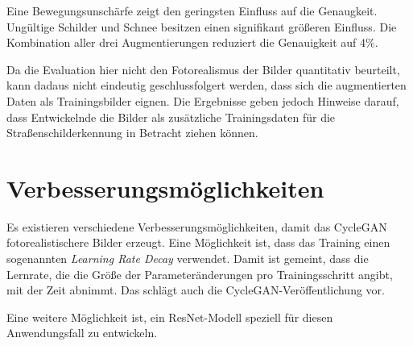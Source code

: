 Eine Bewegungsunschärfe zeigt den geringsten Einfluss auf die Genaugkeit. Ungültige Schilder und Schnee besitzen einen signifikant größeren Einfluss. Die Kombination aller drei Augmentierungen reduziert die Genauigkeit auf 4\%.

Da die Evaluation hier nicht den Fotorealismus der Bilder quantitativ beurteilt, kann dadaus nicht eindeutig geschlussfolgert werden, dass sich die augmentierten Daten als Trainingsbilder eignen. Die Ergebnisse geben jedoch Hinweise darauf, dass Entwickelnde die Bilder als zusätzliche Trainingsdaten für die Straßenschilderkennung in Betracht ziehen können.

\section{Verbesserungsmöglichkeiten}

Es existieren verschiedene Verbesserungsmöglichkeiten, damit das \ac{CycleGAN} fotorealistischere Bilder erzeugt. Eine Möglichkeit ist, dass das Training einen sogenannten \emph{Learning Rate Decay} verwendet. Damit ist gemeint, dass die Lernrate, die die Größe der Parameteränderungen pro Trainingsschritt angibt, mit der Zeit abnimmt. Das schlägt auch die \ac{CycleGAN}-Veröffentlichung vor.

Eine weitere Möglichkeit ist, ein ResNet-Modell speziell für diesen Anwendungsfall zu entwickeln.

